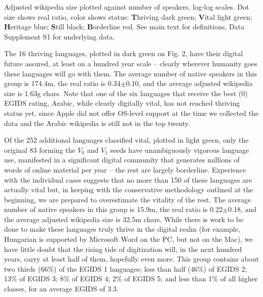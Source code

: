 \documentclass[10pt]{article}
\begin{document}
\newpage

Adjusted wikipedia size plotted against number of speakers, log-log scales.
Dot size shows real ratio, color shows status: {\bf T}hriving dark green; {\bf
  V}ital light green; {\bf H}eritage blue; {\bf S}till black; {\bf B}orderline
red. See main text for definitions, Data Supplement S1 for underlying data.




\medskip
The 16 thriving languages, plotted in dark green on Fig. 2, have their
digital future assured, at least on a hundred year scale -- clearly wherever
humanity goes these languages will go with them. The average number of native
speakers in this group is 174.4m, the real ratio is 0.34$\pm$0.10, and the
average adjusted wikipedia size is 1.63g chars. Note that one of the six
languages that receive the best (0) EGIDS rating, Arabic, while clearly
digitally vital, has not reached thriving status yet, since Apple did not
offer OS-level support at the time we collected the data and the Arabic
wikipedia is still not in the top twenty. 

Of the 252 additional languages classified vital, plotted in light green, only
the original 83 forming the $V_0$ and $V_1$ seeds have unambiguously vigorous
language use, manifested in a significant digital community that generates
millions of words of online material per year -- the rest are largely
borderline. Experience with the individual cases suggests that no more than
150 of these languages are actually vital but, in keeping with the
conservative methodology outlined at the beginning, we are prepared to
overestimate the vitality of the rest.  The average number of native speakers
in this group is 15.9m, the real ratio is 0.22$\pm$0.18, and the average
adjusted wikipedia size is 32.5m chars.  While there is work to be done to
make these languages truly thrive in the digital realm (for example, Hungarian
is supported by Microsoft Word on the PC, but not on the Mac), we have little
doubt that the rising tide of digitization will, in the next hundred years,
carry at least half of them, hopefully even more. This group contains about
two thirds (66\%) of the EGIDS 1 languages; less than half (46\%) of EGIDS 2;
13\% of EGIDS 3; 8\% of EGIDS 4; 2\% of EGIDS 5; and less than 1\% of all
higher classes, for an average EGIDS of 3.3.
\end{document}

